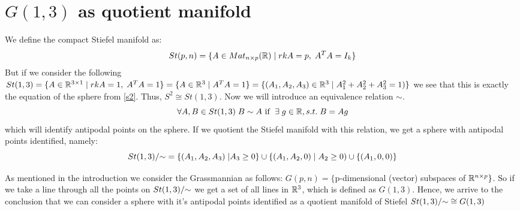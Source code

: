 \documentclass[11pt,a4paper]{report}
\begin{document}
\section{$G(1,3)$ as quotient manifold} 
We define the compact Stiefel manifold as:
\begin{equation}
St(p,n) = \{ A \in Mat_{n \times p}(\mathbb{R}) \; | \; rkA = p, \; A^T A = I_k \}
\end{equation}
But if we consider the following $St(1,3) = \{ A \in \mathbb{R}^{3 \times 1} \; | \; rkA=1, \; A^T A = 1 \} = \{ A \in \mathbb{R}^3 \; | \; A^T A = 1 \} = 
\{ (A_1, A_2, A_3) \in \mathbb{R}^3 \; | \; A_1^2 + A_2^2 + A_3^2 = 1) \} $ 
we see that this is exactly the equation of the sphere from \ref{s2}. Thus, $S^2 \cong St(1,3)$.
Now we will introduce an equivalence relation $ \sim $.
$$ \forall A,B \in St(1,3) \; B \sim A \text{ if } \; \exists \; g \in \mathbb{R}, s.t. \; B = A g $$
which will identify antipodal points on the sphere.
If we quotient the Stiefel manifold with this relation, we get a sphere with antipodal points identified, namely: 
$$ St(1,3)/{\sim} = \{ (A_1, A_2, A_3) \; | A_3 \geq 0 \} \cup \{ (A_1, A_2, 0) \; | \; A_2 \geq 0) \cup \{ (A_1, 0, 0) \}  $$

As mentioned in the introduction we consider the Grassmannian as follows:
$G(p,n) = \{ $p-dimensional (vector) subspaces of $\mathbb{R}^{n \times p} \}$.
So if we take a line through all the points on $St(1,3)/{\sim}$ we get a set of all lines in $\mathbb{R}^3$, which is defined as $G(1,3)$. 
Hence, we arrive to the conclusion that we can consider a sphere with it's antipodal points identified as a quotient manifold of Stiefel $St(1,3)/{\sim} \cong G(1,3)$
\newline
\end{document}
